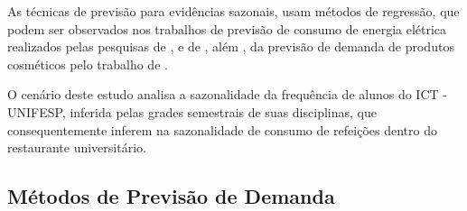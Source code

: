            
As técnicas de previsão para evidências sazonais, usam métodos de regressão, que podem ser observados nos trabalhos de previsão de consumo de energia elétrica realizados pelas pesquisas de ,  e de , além , da previsão de demanda de produtos cosméticos pelo trabalho de .


O cenário deste estudo analisa a sazonalidade da frequência de alunos do ICT - UNIFESP, inferida pelas grades semestrais de suas disciplinas, que consequentemente inferem na sazonalidade de consumo de refeições dentro do restaurante universitário.\newline

\subsection{Métodos de Previsão de Demanda} 

